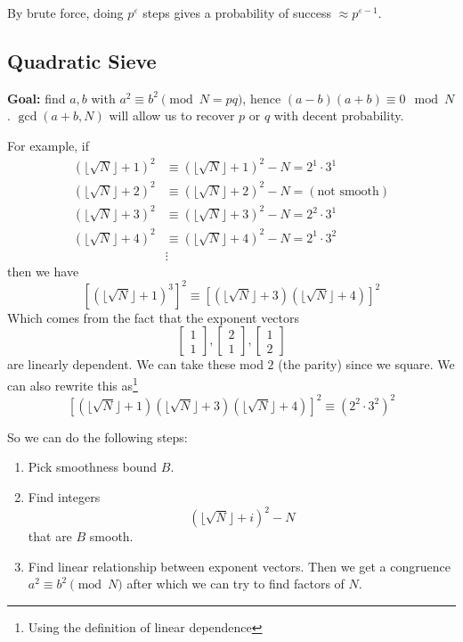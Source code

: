 By brute force, doing $p^\varepsilon$ steps gives a probability of success $\approx p^{\varepsilon - 1}$.

\subsection{Quadratic Sieve}
\textbf{Goal:} find $a, b$ with $a^2\equiv b^2\pmod{N = pq}$, hence $(a-b)(a+b)\equiv 0\mod N$. $\gcd(a+b, N)$ will allow us to recover $p$ or $q$ with decent probability.

\begin{example}\label{example:quadratic-sieve}
    For example, if
    \begin{align*}
        (\lfloor\sqrt{N}\rfloor + 1)^2 & \equiv (\lfloor\sqrt{N}\rfloor + 1)^2 - N
        = 2^1\cdot 3^1                                                             \\
        (\lfloor\sqrt{N}\rfloor + 2)^2 & \equiv (\lfloor\sqrt{N}\rfloor + 2)^2 - N
        = (\text{not smooth})                                                      \\
        (\lfloor\sqrt{N}\rfloor + 3)^2 & \equiv (\lfloor\sqrt{N}\rfloor + 3)^2 - N
        = 2^2\cdot 3^1                                                             \\
        (\lfloor\sqrt{N}\rfloor + 4)^2 & \equiv (\lfloor\sqrt{N}\rfloor + 4)^2 - N
        = 2^1\cdot 3^2                                                             \\
                                       & \vdots
    \end{align*}
    then we have
    \[\left[(\lfloor\sqrt{N}\rfloor + 1)^3\right]^2 \equiv \left[(\lfloor\sqrt{N}\rfloor + 3) (\lfloor\sqrt{N}\rfloor + 4)\right]^2\]
    Which comes from the fact that the exponent vectors
    \[\begin{bmatrix}1\\1\end{bmatrix}, \begin{bmatrix}2\\1\end{bmatrix}, \begin{bmatrix}1\\2\end{bmatrix}\]
    are linearly dependent. We can take these mod $2$ (the parity) since we square. We can also rewrite this as\footnote{Using the definition of linear dependence}
    \[\left[(\lfloor\sqrt{N}\rfloor + 1)(\lfloor\sqrt{N}\rfloor + 3) (\lfloor\sqrt{N}\rfloor + 4)\right]^2\equiv \left(2^2\cdot 3^2\right)^2\]
\end{example}
So we can do the following steps:
\begin{enumerate}
    \item Pick smoothness bound $B$.
    \item Find integers
          \[(\lfloor \sqrt{N}\rfloor + i)^2 - N\]
          that are $B$ smooth.
    \item Find linear relationship between exponent vectors. Then we get a congruence $a^2\equiv b^2\pmod N$ after which we can try to find factors of $N$. 
\end{enumerate}